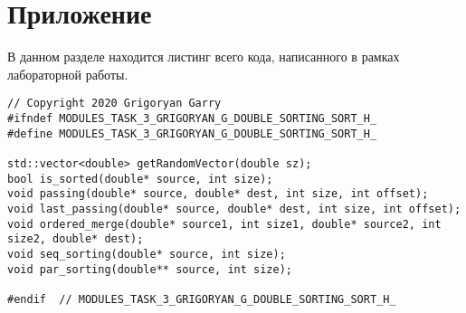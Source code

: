 \documentclass{report}
\begin{document}
\section*{Приложение}
В данном разделе находится листинг всего кода, написанного в рамках лабораторной работы.
\begin{lstlisting}
// Copyright 2020 Grigoryan Garry
#ifndef MODULES_TASK_3_GRIGORYAN_G_DOUBLE_SORTING_SORT_H_
#define MODULES_TASK_3_GRIGORYAN_G_DOUBLE_SORTING_SORT_H_

std::vector<double> getRandomVector(double sz);
bool is_sorted(double* source, int size);
void passing(double* source, double* dest, int size, int offset);
void last_passing(double* source, double* dest, int size, int offset);
void ordered_merge(double* source1, int size1, double* source2, int size2, double* dest);
void seq_sorting(double* source, int size);
void par_sorting(double** source, int size);

#endif  // MODULES_TASK_3_GRIGORYAN_G_DOUBLE_SORTING_SORT_H_

\end{lstlisting}
\newpage
\end{document}
